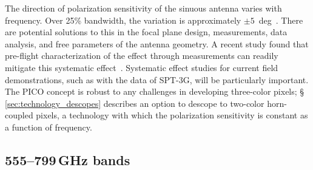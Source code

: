 

The direction of polarization sensitivity of the sinuous antenna varies with frequency. Over 25\% bandwidth, the variation is approximately $\pm 5$~deg~\citep{obrient2008b}. 
There are potential solutions to this in the focal plane design, measurements, data analysis, and free parameters of the antenna geometry.  A recent study found that pre-flight characterization of the effect through measurements can readily mitigate this systematic effect~\citep{picoweb_wobble}. Systematic effect studies for current field demonstrations, such as with the data of SPT-3G, will be particularly important. The PICO concept is robust to any challenges in developing three-color pixels; \S\,\ref{sec:technology_descopes} describes an option to descope to two-color horn-coupled pixels, a technology with which the polarization sensitivity is constant as a function of frequency.



\subsection{555--799\,GHz bands}
\label{sec:dev_arrays}

